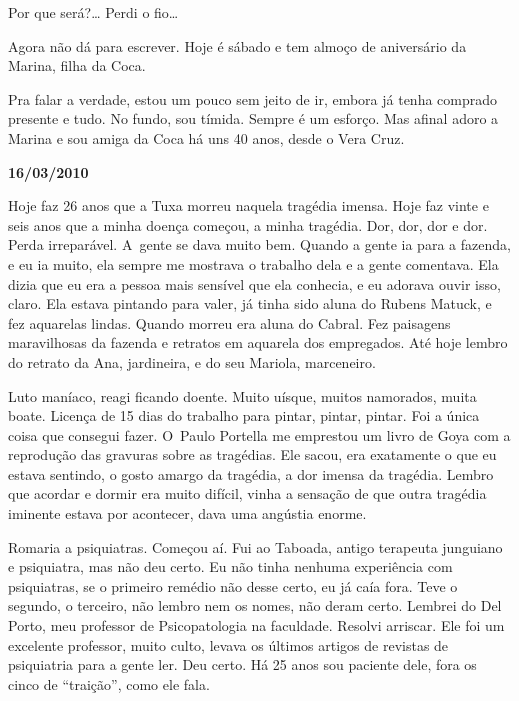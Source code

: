 Por que será?… Perdi o fio…

Agora não dá para escrever. Hoje é sábado e tem almoço de aniversário da
Marina, filha da Coca.

Pra falar a verdade, estou um pouco sem jeito de ir, embora já tenha
comprado presente e tudo. No fundo, sou tímida. Sempre é um esforço. Mas
afinal adoro a Marina e sou amiga da Coca há uns 40 anos, desde o Vera
Cruz.

\begin{center}\textbf{\asterisc{}}\end{center}


\begin{flushright}\textbf{16/03/2010}\end{flushright}


Hoje faz 26 anos que a Tuxa morreu naquela tragédia imensa. Hoje faz
vinte e seis anos que a minha doença começou, a minha tragédia. Dor,
dor, dor e dor. Perda irreparável. A~gente se dava muito bem. Quando a
gente ia para a fazenda, e eu ia muito, ela sempre me mostrava o
trabalho dela e a gente comentava. Ela dizia que eu era a pessoa mais
sensível que ela conhecia, e eu adorava ouvir isso, claro. Ela estava
pintando para valer, já tinha sido aluna do Rubens Matuck, e fez
aquarelas lindas. Quando morreu era aluna do Cabral. Fez paisagens
maravilhosas da fazenda e retratos em aquarela dos empregados. Até hoje
lembro do retrato da Ana, jardineira, e do seu Mariola, marceneiro.

Luto maníaco, reagi ficando doente. Muito uísque, muitos namorados,
muita boate. Licença de 15 dias do trabalho para pintar, pintar, pintar.
Foi a única coisa que consegui fazer. O~Paulo Portella me emprestou um
livro de Goya com a reprodução das gravuras sobre as tragédias. Ele
sacou, era exatamente o que eu estava sentindo, o gosto amargo da
tragédia, a dor imensa da tragédia. Lembro que acordar e dormir era
muito difícil, vinha a sensação de que outra tragédia iminente estava
por acontecer, dava uma angústia enorme.

Romaria a psiquiatras. Começou aí. Fui ao Taboada, antigo terapeuta
junguiano e psiquiatra, mas não deu certo. Eu não tinha nenhuma
experiência com psiquiatras, se o primeiro remédio não desse certo, eu
já caía fora. Teve o segundo, o terceiro, não lembro nem os nomes, não
deram certo. Lembrei do Del Porto, meu professor de Psicopatologia na
faculdade. Resolvi arriscar. Ele foi um excelente professor, muito
culto, levava os últimos artigos de revistas de psiquiatria para a gente
ler. Deu certo. Há 25 anos sou paciente dele, fora os cinco de
``traição'', como ele fala.

